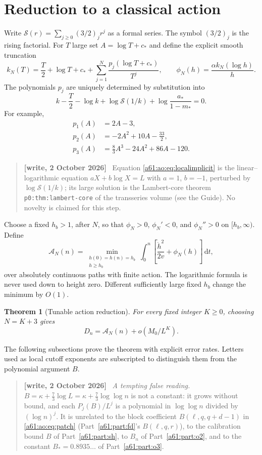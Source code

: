 \documentclass[11pt,letterpaper]{article}
\numberwithin{equation}{section}
\newtheorem{theorem}{Theorem}[section]
\theoremstyle{remark}\newtheorem{remark}[theorem]{Remark}
\newcommand{\A}{\mathcal A}
\newcommand{\Srow}{\mathcal S}
\newcommand{\dd}{\,\mathrm d}
\newenvironment{writenote}{\par\smallskip\begin{quote}\small\textbf{[write, 2 October 2026]}\ }{\end{quote}\smallskip}
\begin{document}
\section{Reduction to a classical action}\label{a61:ao:sec:reduction}
Write $\Srow(r)=\sum_{j\ge0}(3/2)_jr^j$ as a formal series. The symbol
$(3/2)_j$ is the rising factorial. For $T$ large set $A=\log T+c_*$
and define the explicit smooth truncation
\begin{equation}\label{a61:ao:eq:kN}
 k_N(T)=\frac T2+\log T+c_*+
 \sum_{j=1}^{N}\frac{p_j(\log T+c_*)}{T^j},\qquad
 \phi_N(h)=\frac{\alpha k_N(\log h)}h.
\end{equation}
The polynomials $p_j$ are uniquely determined by substitution into
\begin{equation}\label{a61:ao:eq:localimplicit}
 k-\frac T2-\log k+\log\Srow(1/k)
 +\log\frac{a_*}{1-m_*}=0.
\end{equation}
For example,
\begin{align*}
 p_1(A)&=2A-3,\\
 p_2(A)&=-2A^2+10A-\tfrac{33}{2},\\
 p_3(A)&=\tfrac83A^3-24A^2+86A-120.
\end{align*}
\begin{writenote}
Equation \eqref{a61:ao:eq:localimplicit} is the linear--logarithmic equation $aX+b\log X=L$ with $a=1$, $b=-1$, perturbed by $\log\mathcal S(1/k)$; its large solution is the Lambert-core theorem \texttt{p0:thm:lambert-core} of the transseries volume (see the Guide). No novelty is claimed for this step.
\end{writenote}

Choose a fixed $h_b>1$, after $N$, so that $\phi_N>0$,
$\phi_N'<0$, and $\phi_N''>0$ on $[h_b,\infty)$. Define
\begin{equation}\label{a61:ao:eq:actiondef}
 \A_N(n)=\min_{\substack{h(0)=h(n)=h_b\\h\ge h_b}}
 \int_0^n\left[\frac{\dot h^2}{2v}+\phi_N(h)\right]\dd t,
\end{equation}
over absolutely continuous paths with finite action. The logarithmic
formula is never used down to height zero. Different sufficiently
large fixed $h_b$ change the minimum by $O(1)$.

\begin{theorem}[Tunable action reduction]\label{a61:ao:thm:reduction}
For every fixed integer $K\ge0$, choosing $N=K+3$ gives
\[
 D_n=\A_N(n)+o(M_0/L^K).
\]
\end{theorem}
The following subsections prove the theorem with explicit error rates.
Letters used as local cutoff exponents are subscripted to distinguish
them from the polynomial argument $B$.
\begin{writenote}
\emph{A tempting false reading.} $B=\kappa+\frac73\log L=\kappa+\frac73\log\log n$ is not a constant: it grows without bound, and each $P_j(B)/L^j$ is a polynomial in $\log\log n$ divided by $(\log n)^j$. It is unrelated to the block coefficient $B(\ell,q,q+d-1)$ in \eqref{a61:ao:eq:patch} (Part~\ref{a61:part:fd}'s $B(\ell,q,r)$), to the calibration bound $B$ of Part~\ref{a61:part:sh}, to $B_n$ of Part~\ref{a61:part:o2}, and to the constant $B_*=0.8935\ldots$ of Part~\ref{a61:part:o3}.
\end{writenote}
\end{document}

